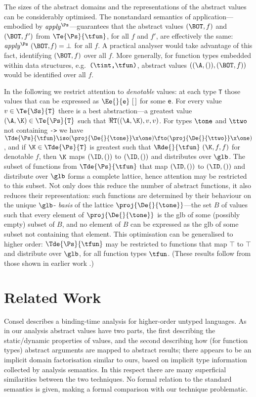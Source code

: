 \begin{article}
The sizes of the abstract domains and the representations of the
abstract values can be considerably optimised.  The nonstandard
semantics of application---embodied by $\it apply^{\Ps}$---guarantees
that the abstract values $(\BOT,f)$ and $(\BOT,f')$ from
$\Te{\Ps}{\tfun}$, for all $f$ and $f'$, are effectively the same:
$\it apply^{\Ps}~(\BOT,f)=\bot$ for all $f$.  A practical analyser
would take advantage of this fact, identifying $(\BOT,f)$ over all
$f$.  More generally, for function types embedded within data
structures, e.g.\ $\mbox{\tt (}\tint\mbox{\tt ,}\tfun\mbox{\tt )}$, abstract values
$((\A,()),(\BOT,f))$ would be identified over all $f$.

In the following we restrict attention to {\it denotable\/} values: at
each type \mbox{\tt T} those values that can be expressed as $\Ee{}{\mbox{\tt e}}~[\,]$
for some \mbox{\tt e}.  For every value $v\in\Te{\Ss}{\mbox{\tt T}}$ there is a best
abstraction---a greatest value $(\A,\K)\in\Te{\Ps}{\mbox{\tt T}}$ such that
$\Re{}{\mbox{\tt T}}((\A,\K),v,v)$.  For types $\tone$ and $\ttwo$ not
containing \mbox{\tt ->} we have
$\Tde{\Ps}{\tfun}\iso(\proj{\De{}{\tone}}\x\one)\fto(\proj{\De{}{\ttwo}}\x\one)$,
and if $\K\in\Tde{\Ps}{\mbox{\tt T}}$ is greatest such that
$\Rde{}{\tfun}~(\K,f,f)$ for denotable $f$, then $\K$ maps $(\ID,())$
to $(\ID,())$ and distributes over $\glb$.  The subset of functions
from $\Tde{\Ps}{\tfun}$ that map $(\ID,())$ to $(\ID,())$ and
distribute over $\glb$ forms a complete lattice, hence attention may
be restricted to this subset.  Not only does this reduce the number of
abstract functions, it also reduces their representation: such
functions are determined by their behaviour on the unique $\glb$-{\it
basis\/} of the lattice $\proj{\De{}{\tone}}$---the set $B$ of values
such that every element of $\proj{\De{}{\tone}}$ is the glb of some
(possibly empty) subset of $B$, and no element of $B$ can be expressed
as the glb of some subset not containing that element.  This
optimisation can be generalised to higher order: $\Tde{\Ps}{\tfun}$
may be restricted to functions that map $\top$ to $\top$ and
distribute over $\glb$, for all function types $\tfun$.  (These
results follow from those shown in earlier work \cite{Dav94}.)

\section{Related Work}

Consel \cite{Con90} describes a binding-time analysis for higher-order
untyped languages.  As in our analysis abstract values have two parts,
the first describing the static/dynamic properties of values, and the
second describing how (for function types) abstract arguments are
mapped to abstract results; there appears to be an implicit domain
factorisation similar to ours, based on implicit type information
collected by analysis semantics.  In this respect there are many
superficial similarities between the two techniques.  No formal
relation to the standard semantics is given, making a formal
comparison with our technique problematic.


\end{article}
